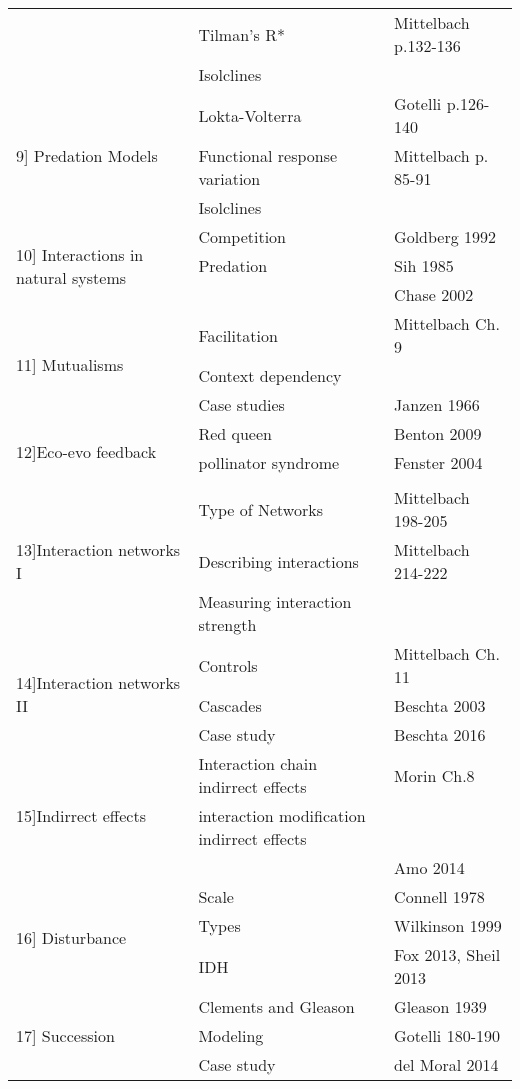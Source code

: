\documentclass{article}
\begin{document}
{\begin{tabularx}{\columnwidth}{|p{4cm}|p{9cm}|p{5cm}|}
& Tilman's R* &  Mittelbach p.132-136  \\ 
& Isolclines  &  \\ 
\hline
\multirow{3}{10em}{9] Predation Models } & Lokta-Volterra  & Gotelli p.126-140 \\
& Functional response variation & Mittelbach p. 85-91   \\ 
& Isolclines  &  \\ 
\hline
\multirow{3}{10em}{10] Interactions in natural systems } & Competition  & Goldberg 1992 \\
& Predation & Sih 1985  \\ 
&  & Chase 2002 \\ 
\hline
\multirow{3}{10em}{11] Mutualisms } & Facilitation  & Mittelbach Ch. 9  \\
& Context dependency &   \\ 
& Case studies & Janzen 1966 \\ 
\hline
\multirow{3}{10em}{12]Eco-evo feedback } & Red queen  & Benton 2009 \\
& pollinator syndrome & Fenster 2004  \\ 
&  &  \\ 
\hline
\multirow{3}{10em}{13]Interaction networks I } & Type of Networks  & Mittelbach 198-205 \\
& Describing interactions &  Mittelbach 214-222 \\ 
& Measuring interaction strength &  \\ 
\hline
\multirow{3}{10em}{14]Interaction networks II } & Controls  & Mittelbach Ch. 11 \\
& Cascades & Beschta 2003  \\ 
& Case study & Beschta 2016 \\ 
\hline
\multirow{3}{10em}{15]Indirrect effects } & Interaction chain indirrect effects  & Morin Ch.8 \\
& interaction modification indirrect effects &   \\ 
&  & Amo 2014 \\ 
\hline
\multirow{3}{10em}{16] Disturbance } & Scale  & Connell 1978 \\
& Types & Wilkinson 1999  \\ 
& IDH & Fox 2013, Sheil 2013  \\ 
\hline
\multirow{3}{10em}{17] Succession } & Clements and Gleason  & Gleason 1939 \\
& Modeling & Gotelli 180-190  \\ 
& Case study &  del Moral 2014\\ 

\end{tabularx}}
\end{document}
